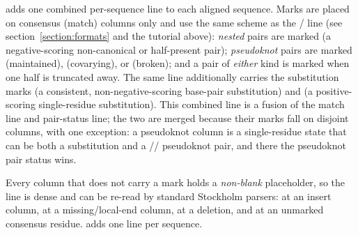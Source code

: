 \begin{sreitems}{}
\item[\emprog{--bpstatus}]
  adds one combined per-sequence  line to each aligned
  sequence. Marks are placed on consensus (match) columns only and use the same
  scheme as the /  line (see
  section~\ref{section:formats} and the  tutorial above):
  \emph{nested} pairs are marked  (a negative-scoring non-canonical or
  half-present pair); \emph{pseudoknot} pairs are marked \otext{=} (maintained),
  \otext{\$} (covarying), or  (broken); and a pair of \emph{either} kind
  is marked  when one half is truncated away. The same line additionally carries the
  substitution marks \otext{:} (a consistent, non-negative-scoring base-pair
  substitution) and \otext{+} (a positive-scoring single-residue substitution).
  This combined line is a fusion of the  match line and pair-status
  line; the two are merged because their marks fall on disjoint columns, with one
  exception: a pseudoknot column is a single-residue state that can be both a
  \otext{+} substitution and a \otext{=}/\otext{\$}/ pseudoknot pair, and
  there the pseudoknot pair status wins.

  Every column that does not carry a mark holds a \emph{non-blank} placeholder, so
  the line is dense and can be re-read by standard Stockholm parsers:  at
  an insert column, \otext{\~{}} at a missing/local-end column, \otext{-} at a
  deletion, and \otext{\_} at an unmarked consensus residue. 
  adds one line per sequence.


\end{sreitems}

